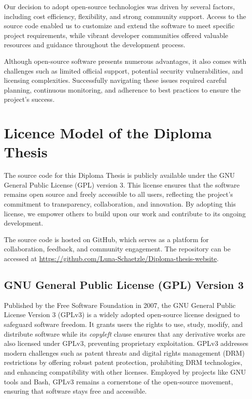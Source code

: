 Our decision to adopt open-source technologies was driven by several factors, 
including cost efficiency, flexibility, and strong community support. 
Access to the source code enabled us to customize and extend the software to meet specific project requirements, 
while vibrant developer communities offered valuable resources and guidance throughout the development process.

Although open-source software presents numerous advantages, it also comes with challenges such as limited official support, 
potential security vulnerabilities, and licensing complexities. Successfully navigating these issues required careful planning, 
continuous monitoring, and adherence to best practices to ensure the project's success.

\section{Licence Model of the Diploma Thesis}

The source code for this Diploma Thesis is publicly available under the GNU General Public License (GPL) version 3. 
This license ensures that the software remains open source and freely accessible to all users, 
reflecting the project's commitment to transparency, collaboration, and innovation. By adopting this license, 
we empower others to build upon our work and contribute to its ongoing development.

The source code is hosted on GitHub, which serves as a platform for collaboration, feedback, and community engagement. 
The repository can be accessed at \url{https://github.com/Luna-Schaetzle/Diploma-thesis-website}.

\subsection{GNU General Public License (GPL) Version 3}

Published by the Free Software Foundation in 2007, the GNU General Public License Version 3 (GPLv3) is a widely adopted open-source license designed to safeguard software freedom. 
It grants users the rights to use, study, modify, and distribute software while its \textit{copyleft} clause ensures that any derivative works are also licensed under GPLv3, 
preventing proprietary exploitation. GPLv3 addresses modern challenges such as patent threats and digital rights management (DRM) restrictions by offering robust patent protection, prohibiting DRM technologies, 
and enhancing compatibility with other licenses. Employed by projects like GNU tools and Bash, GPLv3 remains a cornerstone of the open-source movement, ensuring that software stays free and accessible.

